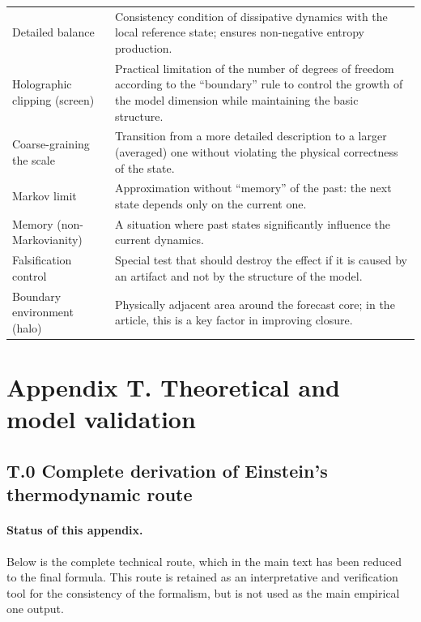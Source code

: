 \documentclass[11pt,a4paper]{article}
\theoremstyle{definition}
\theoremstyle{plain}
\theoremstyle{remark}
\begin{document}
\begin{table}[H]
\begin{tabular}{@{}p{3.6cm}p{10.4cm}@{}}
Detailed balance & Consistency condition of dissipative dynamics with the local reference state; ensures non-negative entropy production. \\
Holographic clipping (screen) & Practical limitation of the number of degrees of freedom according to the ``boundary'' rule to control the growth of the model dimension while maintaining the basic structure. \\
Coarse-graining the scale & Transition from a more detailed description to a larger (averaged) one without violating the physical correctness of the state. \\
Markov limit & Approximation without ``memory'' of the past: the next state depends only on the current one. \\
Memory (non-Markovianity) & A situation where past states significantly influence the current dynamics. \\
Falsification control & Special test that should destroy the effect if it is caused by an artifact and not by the structure of the model. \\
Boundary environment (halo) & Physically adjacent area around the forecast core; in the article, this is a key factor in improving closure. \\
\bottomrule
\end{tabular}
\end{table}

\section*{Appendix T. Theoretical and model validation}
\label{sec:appendix:toy}

\subsection*{T.0 Complete derivation of Einstein's thermodynamic route}
\label{sec:appendix:einstein_full}

\paragraph{Status of this appendix.}
Below is the complete technical route, which in the main text has been reduced to the final formula.
This route is retained as an interpretative and verification tool for the consistency of the formalism,
but is not used as the main empirical one output.
\end{document}
